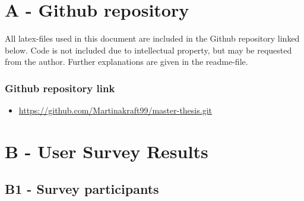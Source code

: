

\chapter*{A - Github repository}

All latex-files used in this document are included in the Github repository linked below. Code is not included due to intellectual property, but may be requested from the author. Further explanations are given in the readme-file. 


\subsection*{Github repository link}
\begin{itemize}
    \item \url{https://github.com/Martinakraft99/master-thesis.git}
\end{itemize}




\chapter*{B - User Survey Results}

\label{appendix:user_survey}
\renewcommand{\thefigure}{B.\arabic{figure}}
\setcounter{figure}{0}
\renewcommand{\thetable}{B.\arabic{table}}
\setcounter{table}{0}

\section*{\large{B1 - Survey participants}}
\vspace*{1cm}


